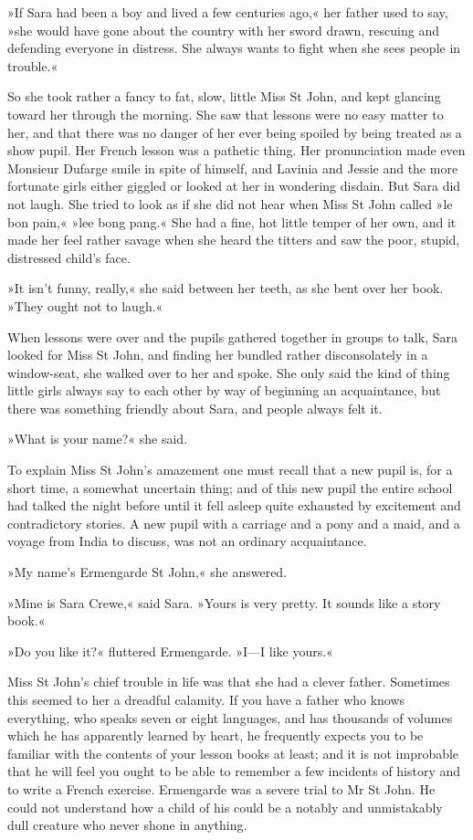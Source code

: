 »If Sara had been a boy and lived a few centuries ago,« her father used to say, »she would have gone about the country with her sword drawn, rescuing and defending everyone in distress. She always wants to fight when she sees people in trouble.«

So she took rather a fancy to fat, slow, little Miss St John, and kept glancing toward her through the morning. She saw that lessons were no easy matter to her, and that there was no danger of her ever being spoiled by being treated as a show pupil. Her French lesson was a pathetic thing. Her pronunciation made even Monsieur Dufarge smile in spite of himself, and Lavinia and Jessie and the more fortunate girls either giggled or looked at her in wondering disdain. But Sara did not laugh. She tried to look as if she did not hear when Miss St John called »le bon pain,« »lee bong pang.« She had a fine, hot little temper of her own, and it made her feel rather savage when she heard the titters and saw the poor, stupid, distressed child's face.

»It isn't funny, really,« she said between her teeth, as she bent over her book. »They ought not to laugh.«

When lessons were over and the pupils gathered together in groups to talk, Sara looked for Miss St John, and finding her bundled rather disconsolately in a window-seat, she walked over to her and spoke. She only said the kind of thing little girls always say to each other by way of beginning an acquaintance, but there was something friendly about Sara, and people always felt it.

»What is your name?« she said.

To explain Miss St John's amazement one must recall that a new pupil is, for a short time, a somewhat uncertain thing; and of this new pupil the entire school had talked the night before until it fell asleep quite exhausted by excitement and contradictory stories. A new pupil with a carriage and a pony and a maid, and a voyage from India to discuss, was not an ordinary acquaintance.

»My name's Ermengarde St John,« she answered.

»Mine is Sara Crewe,« said Sara. »Yours is very pretty. It sounds like a story book.«

»Do you like it?« fluttered Ermengarde. »I—I like yours.«

Miss St John's chief trouble in life was that she had a clever father. Sometimes this seemed to her a dreadful calamity. If you have a father who knows everything, who speaks seven or eight languages, and has thousands of volumes which he has apparently learned by heart, he frequently expects you to be familiar with the contents of your lesson books at least; and it is not improbable that he will feel you ought to be able to remember a few incidents of history and to write a French exercise. Ermengarde was a severe trial to Mr St John. He could not understand how a child of his could be a notably and unmistakably dull creature who never shone in anything.

